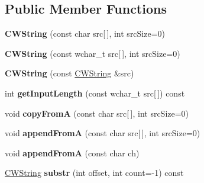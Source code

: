 \subsection*{Public Member Functions}
\begin{DoxyCompactItemize}
\item 
\hypertarget{classps_1_1CWString_af63c4d94b71f55066b9a8ef9f65b73ab}{}{\bfseries C\+W\+String} (const char src\mbox{[}$\,$\mbox{]}, int src\+Size=0)\label{classps_1_1CWString_af63c4d94b71f55066b9a8ef9f65b73ab}

\item 
\hypertarget{classps_1_1CWString_a4b8cd3d9f702d3ff9d8d7f3f86c7b78c}{}{\bfseries C\+W\+String} (const wchar\+\_\+t src\mbox{[}$\,$\mbox{]}, int src\+Size=0)\label{classps_1_1CWString_a4b8cd3d9f702d3ff9d8d7f3f86c7b78c}

\item 
\hypertarget{classps_1_1CWString_ac59f35cbe061c4e4bfca63f31b493d44}{}{\bfseries C\+W\+String} (const \hyperlink{classps_1_1CWString}{C\+W\+String} \&src)\label{classps_1_1CWString_ac59f35cbe061c4e4bfca63f31b493d44}

\item 
\hypertarget{classps_1_1CWString_a6ac949421b7e3bceee4962aaf98947dd}{}int {\bfseries get\+Input\+Length} (const wchar\+\_\+t src\mbox{[}$\,$\mbox{]}) const \label{classps_1_1CWString_a6ac949421b7e3bceee4962aaf98947dd}

\item 
\hypertarget{classps_1_1CWString_a1c13d6dbd63213e9a6b96c5b338f21de}{}void {\bfseries copy\+From\+A} (const char src\mbox{[}$\,$\mbox{]}, int src\+Size=0)\label{classps_1_1CWString_a1c13d6dbd63213e9a6b96c5b338f21de}

\item 
\hypertarget{classps_1_1CWString_adf46395d980878745c7cc68b38d2c6ed}{}void {\bfseries append\+From\+A} (const char src\mbox{[}$\,$\mbox{]}, int src\+Size=0)\label{classps_1_1CWString_adf46395d980878745c7cc68b38d2c6ed}

\item 
\hypertarget{classps_1_1CWString_a8759dc8169f88134e062240c8a496d96}{}void {\bfseries append\+From\+A} (const char ch)\label{classps_1_1CWString_a8759dc8169f88134e062240c8a496d96}

\item 
\hypertarget{classps_1_1CWString_a79be4ac59b21ae801f5e6da711812966}{}\hyperlink{classps_1_1CWString}{C\+W\+String} {\bfseries substr} (int offset, int count=-\/1) const \label{classps_1_1CWString_a79be4ac59b21ae801f5e6da711812966}


\end{DoxyCompactItemize}
